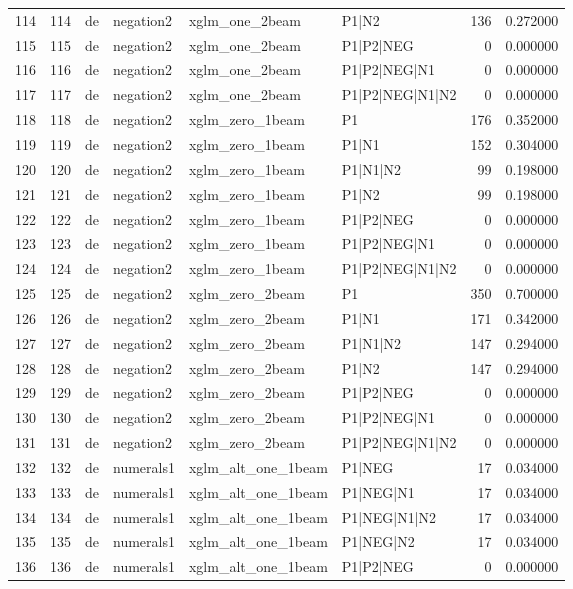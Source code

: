 \begin{tabular}{lrllllrr}
114 & 114 & de & negation2 & xglm_one_2beam & P1|N2 & 136 & 0.272000 \\
115 & 115 & de & negation2 & xglm_one_2beam & P1|P2|NEG & 0 & 0.000000 \\
116 & 116 & de & negation2 & xglm_one_2beam & P1|P2|NEG|N1 & 0 & 0.000000 \\
117 & 117 & de & negation2 & xglm_one_2beam & P1|P2|NEG|N1|N2 & 0 & 0.000000 \\
118 & 118 & de & negation2 & xglm_zero_1beam & P1 & 176 & 0.352000 \\
119 & 119 & de & negation2 & xglm_zero_1beam & P1|N1 & 152 & 0.304000 \\
120 & 120 & de & negation2 & xglm_zero_1beam & P1|N1|N2 & 99 & 0.198000 \\
121 & 121 & de & negation2 & xglm_zero_1beam & P1|N2 & 99 & 0.198000 \\
122 & 122 & de & negation2 & xglm_zero_1beam & P1|P2|NEG & 0 & 0.000000 \\
123 & 123 & de & negation2 & xglm_zero_1beam & P1|P2|NEG|N1 & 0 & 0.000000 \\
124 & 124 & de & negation2 & xglm_zero_1beam & P1|P2|NEG|N1|N2 & 0 & 0.000000 \\
125 & 125 & de & negation2 & xglm_zero_2beam & P1 & 350 & 0.700000 \\
126 & 126 & de & negation2 & xglm_zero_2beam & P1|N1 & 171 & 0.342000 \\
127 & 127 & de & negation2 & xglm_zero_2beam & P1|N1|N2 & 147 & 0.294000 \\
128 & 128 & de & negation2 & xglm_zero_2beam & P1|N2 & 147 & 0.294000 \\
129 & 129 & de & negation2 & xglm_zero_2beam & P1|P2|NEG & 0 & 0.000000 \\
130 & 130 & de & negation2 & xglm_zero_2beam & P1|P2|NEG|N1 & 0 & 0.000000 \\
131 & 131 & de & negation2 & xglm_zero_2beam & P1|P2|NEG|N1|N2 & 0 & 0.000000 \\
132 & 132 & de & numerals1 & xglm_alt_one_1beam & P1|NEG & 17 & 0.034000 \\
133 & 133 & de & numerals1 & xglm_alt_one_1beam & P1|NEG|N1 & 17 & 0.034000 \\
134 & 134 & de & numerals1 & xglm_alt_one_1beam & P1|NEG|N1|N2 & 17 & 0.034000 \\
135 & 135 & de & numerals1 & xglm_alt_one_1beam & P1|NEG|N2 & 17 & 0.034000 \\
136 & 136 & de & numerals1 & xglm_alt_one_1beam & P1|P2|NEG & 0 & 0.000000 \\

\end{tabular}
